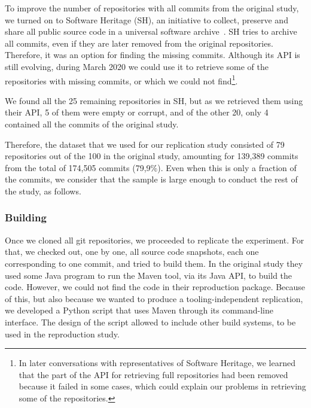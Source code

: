 To improve the number of repositories with all commits from the original study,  we turned on to Software Heritage (SH), an initiative to collect, preserve and share all public source code in a universal software archive~\cite{di2017software,di2018software}. SH tries to archive all commits, even if they are later removed from the original repositories. Therefore, it was an option for finding the missing commits. Although its API is still evolving, during March 2020 we could use it to retrieve some of the repositories with missing commits, or which we could not find\footnote{In later conversations with representatives of Software Heritage, we learned that the part of the API for retrieving full repositories had been removed because it failed in some cases, which could explain our problems in retrieving some of the repositories.}.

We found all the 25 remaining repositories in SH, but as we retrieved them using their API, 5 of them were empty or corrupt, and of the other 20, only 4 contained all the commits of the original study.

Therefore, the dataset that we used for our replication study consisted of 79 repositories out of the 100 in the original study, amounting for 139,389 commits from the total of 174,505 commits (79,9\%). Even when this is only a fraction of the commits, we consider that the sample is large enough to conduct the rest of the study, as follows.

\subsubsection{Building}

Once we cloned all git repositories, we proceeded to replicate the experiment. For that, we checked out, one by one, all source code snapshots, each one corresponding to one commit, and tried to build them. In the original study they used some Java program to run the Maven tool, via its Java API, to build the code. However, we could not find the code in their reproduction package. Because of this, but also because we wanted to produce a tooling-independent replication, we developed a Python script that uses Maven through its command-line interface. The design of the script allowed to include other build systems, to be used in the reproduction study.

